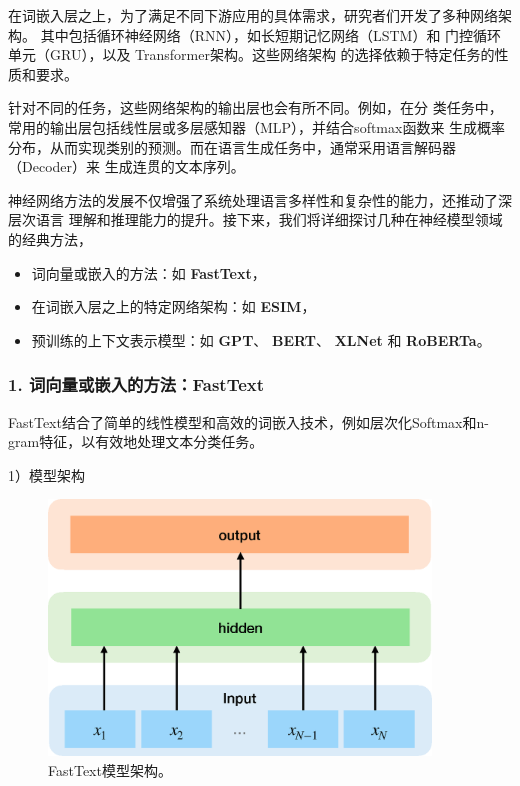 
在词嵌入层之上，为了满足不同下游应用的具体需求，研究者们开发了多种网络架构。
其中包括循环神经网络（RNN），如长短期记忆网络（LSTM\cite{hochreiter1997long}）和
门控循环单元（GRU\cite{cho2014learning}），以及
Transformer架构\cite{vaswani2017attention}。这些网络架构
的选择依赖于特定任务的性质和要求。

针对不同的任务，这些网络架构的输出层也会有所不同。例如，在分
类任务中，常用的输出层包括线性层或多层感知器（MLP），并结合softmax函数来
生成概率分布，从而实现类别的预测。而在语言生成任务中，通常采用语言解码器（Decoder）来
生成连贯的文本序列。

神经网络方法的发展不仅增强了系统处理语言多样性和复杂性的能力，还推动了深层次语言
理解和推理能力的提升。接下来，我们将详细探讨几种在神经模型领域的经典方法，


\begin{itemize}
  \item 词向量或嵌入的方法：如 \textbf{FastText}\cite{joulin2017bag}，
  \item 在词嵌入层之上的特定网络架构：如 \textbf{ESIM}\cite{chen2017enhanced}，
  \item 预训练的上下文表示模型：如 \textbf{GPT}、 \textbf{BERT}、
   \textbf{XLNet}\cite{yang2019xlnet} 和 \textbf{RoBERTa}\cite{liu2019roberta}。
\end{itemize}

\subsubsection*{1. 词向量或嵌入的方法：FastText}

FastText结合了简单的线性模型和高效的词嵌入技术，例如层次化Softmax和n-gram特征，以有效地处理文本分类任务。

1）模型架构

\begin{figure}[th]
  \centering\includegraphics[width=4in]{figures/xulun/fasttext.eps}
  \caption{FastText模型架构。}
  \label{fig1:fasttext}
  \end{figure}

